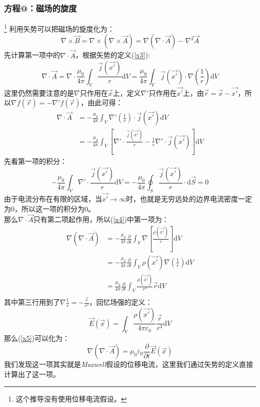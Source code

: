 \documentclass[12pt]{article}
\makeatletter
\newcommand{\Rmnum}[1]{\expandafter\@slowromancap\romannumeral #1@}
\makeatother
\begin{document}
\subsubsection{方程\Rmnum{4}：磁场的旋度}\footnote{这个推导没有使用位移电流假设。}
利用矢势可以把磁场的旋度化为：
\begin{equation}
\nabla\times\Vec{B}=\nabla\times(\nabla\times\Vec{A})=\nabla(\nabla\cdot\Vec{A})-\nabla^2\Vec{A}
\label{x4}
\end{equation}
先计算第一项中的$\nabla\cdot\Vec{A}$，根据矢势的定义(\ref{x3}):
\begin{equation}
    \nabla\cdot\Vec{A}=\nabla\cdot\frac{\mu_0}{4\pi}\int_V \frac{\Vec{j}(\Vec{x'})}{r}\mathrm{d}V=\frac{\mu_0}{4\pi}\int_V \Vec{j}(\Vec{x'})\cdot\nabla(\frac{1}{r})\mathrm{d}V
\end{equation}
这里仍然需要注意的是$\nabla$只作用在$\Vec{x}$上，定义$\nabla'$只作用在$\Vec{x'}$上，由$\Vec{r}=\Vec{x}-\Vec{x'}$，所以$\nabla f(\Vec{r})=-\nabla' f(\Vec{r}) $，由此可得：
\begin{equation}
\begin{split}
   \nabla\cdot\Vec{A} 
   &=-\frac{\mu_0}{4\pi}\int_V \nabla'(\frac{1}{r})\cdot\Vec{j}(\Vec{x'})\mathrm{d}V\\
   &=-\frac{\mu_0}{4\pi}\int_V [\nabla'\cdot \frac{\Vec{j}(\Vec{x'})}{r}-\frac{1}{r}\nabla'\cdot\Vec{j}(\Vec{x'})]\mathrm{d}V  
\end{split}
\end{equation}
先看第一项的积分：
\begin{equation}
    -\frac{\mu_0}{4\pi}\int_V \nabla'\cdot\frac{\Vec{j}(\Vec{x'})}{r}\mathrm{d}V=-\frac{\mu_0}{4\pi}\oint_S \frac{\Vec{j}(\Vec{x'})}{r}\cdot\mathrm{d}\Vec{S}=0
\end{equation}
由于电流分布在有限的区域，当$\Vec{x'}\to \infty$时，也就是无穷远处的边界电流密度一定为0，所以这一项的积分为0。\\
那么$\nabla\cdot\Vec{A}$只有第二项起作用，所以(\ref{x4})中第一项为：
\begin{equation}
\begin{split}
    \nabla(\nabla\cdot\Vec{A})&=-\frac{\mu_0}{4\pi}\frac{\partial}{\partial t}\int_V \nabla[\frac{\rho(\Vec{{x'}})}{r}]\mathrm{d}V\\
    &=-\frac{\mu_0}{4\pi}\frac{\partial}{\partial t}\int_V \rho(\Vec{x'})\nabla(\frac{1}{r})\mathrm{d}V\\
    &=\frac{\mu_0}{4\pi}\frac{\partial}{\partial t}\int_V \frac{\rho(\Vec{x'})}{r^3}\Vec{r}\mathrm{d}V\\
    \end{split}
    \label{x5}
\end{equation}
其中第三行用到了$\nabla\frac{1}{r}=-\frac{\Vec{r}}{r^3}$，回忆场强的定义：
\begin{equation}
    \Vec{E}(\Vec{x})=\int_V \frac{\rho(\Vec{x'})}{4\pi\varepsilon_0}\frac{\Vec{r}}{r^3}\mathrm{d}V
\end{equation}
那么(\ref{x5})可以化为：
\begin{equation}
\nabla(\nabla\cdot\Vec{A})=\mu_0\varepsilon_0\frac{\partial}{\partial t}\Vec{E}(\Vec{x})
\end{equation}
我们发现这一项其实就是\textit{Maxwell}假设的位移电流，这里我们通过矢势的定义直接计算出了这一项。
\end{document}
